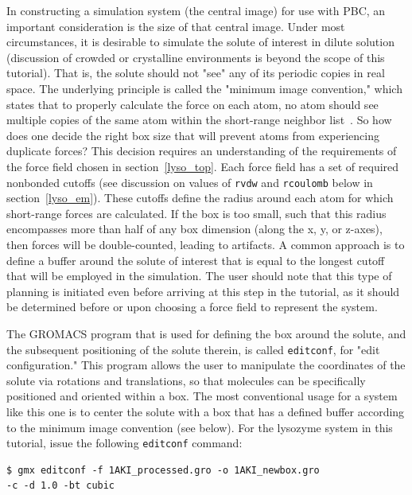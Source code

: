 \documentclass[9pt,tutorial]{livecoms}
\begin{document}
In constructing a simulation system (the central image) for use with PBC, an important consideration is the size of that central image. Under most circumstances, it is desirable to simulate the solute of interest in dilute solution (discussion of crowded or crystalline environments is beyond the scope of this tutorial). That is, the solute should not "see" any of its periodic copies in real space. The underlying principle is called the "minimum image convention," which states that to properly calculate the force on each atom, no atom should see multiple copies of the same atom within the short-range neighbor list~\cite{Frenkel2001}. So how does one decide the right box size that will prevent atoms from experiencing duplicate forces? This decision requires an understanding of the requirements of the force field chosen in section~\ref{lyso_top}. Each force field has a set of required nonbonded cutoffs (see discussion on values of \texttt{rvdw} and \texttt{rcoulomb} below in section~\ref{lyso_em}). These cutoffs define the radius around each atom for which short-range forces are calculated. If the box is too small, such that this radius encompasses more than half of any box dimension (along the x, y, or z-axes), then forces will be double-counted, leading to artifacts. A common approach is to define a buffer around the solute of interest that is equal to the longest cutoff that will be employed in the simulation. The user should note that this type of planning is initiated even before arriving at this step in the tutorial, as it should be determined before or upon choosing a force field to represent the system.

The GROMACS program that is used for defining the box around the solute, and the subsequent positioning of the solute therein, is called \texttt{editconf}, for "edit configuration." This program allows the user to manipulate the coordinates of the solute via rotations and translations, so that molecules can be specifically positioned and oriented within a box. The most conventional usage for a system like this one is to center the solute with a box that has a defined buffer according to the minimum image convention (see below). For the lysozyme system in this tutorial, issue the following \texttt{editconf} command:

\begin{verbatim}
$ gmx editconf -f 1AKI_processed.gro -o 1AKI_newbox.gro 
-c -d 1.0 -bt cubic
\end{verbatim}
\end{document}
